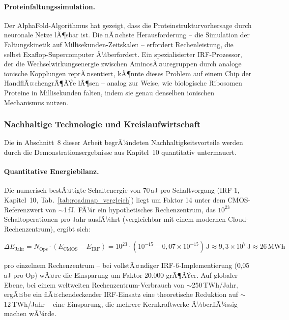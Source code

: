 ﻿\documentclass[a4paper,12pt]{scrreprt}
\theoremstyle{definition}
\begin{document}
\paragraph{Proteinfaltungssimulation.}
Der AlphaFold-Algorithmus hat gezeigt, dass die Proteinstrukturvorhersage
durch neuronale Netze lÃ¶sbar ist. Die nÃ¤chste Herausforderung -- die
Simulation der Faltungskinetik auf Millisekunden-Zeitskalen --
erfordert Rechenleistung, die selbst Exaflop-Supercomputer Ã¼berfordert.
Ein spezialisierter IRF-Prozessor, der die Wechselwirkungsenergie zwischen
AminosÃ¤uregruppen durch analoge ionische Kopplungen reprÃ¤sentiert,
kÃ¶nnte dieses Problem auf einem Chip der HandflÃ¤chengrÃ¶ÃŸe lÃ¶sen --
analog zur Weise, wie biologische Ribosomen Proteine in Millisekunden
falten, indem sie genau denselben ionischen Mechanismus nutzen.

\subsubsection{Nachhaltige Technologie und Kreislaufwirtschaft}
\label{subsubsec:nachhaltigkeit}

Die in Abschnitt~8 dieser Arbeit begrÃ¼ndeten Nachhaltigkeitsvorteile
werden durch die Demonstrationsergebnisse aus Kapitel~10 quantitativ
untermauert.

\paragraph{Quantitative Energiebilanz.}
Die numerisch bestÃ¤tigte Schaltenergie von 70\,aJ pro Schaltvorgang
(IRF-1, Kapitel~10, Tab.~\ref{tab:roadmap_vergleich}) liegt um Faktor 14
unter dem CMOS-Referenzwert von $\sim$1\,fJ. FÃ¼r ein hypothetisches
Rechenzentrum, das $10^{23}$ Schaltoperationen pro Jahr ausfÃ¼hrt
(vergleichbar mit einem modernen Cloud-Rechenzentrum), ergibt sich:

\begin{equation}
	\Delta E_\text{Jahr} = N_\text{Ops} \cdot (E_\text{CMOS} - E_\text{IRF})
	= 10^{23} \cdot (10^{-15} - 0{,}07 \times 10^{-15})\,\text{J}
	\approx 9{,}3 \times 10^{7}\,\text{J} \approx 26\,\text{MWh}
	\label{eq:energieeinsparung}
\end{equation}

pro einzelnem Rechenzentrum -- bei vollstÃ¤ndiger IRF-6-Implementierung
(0,05\,aJ pro Op) wÃ¤re die Einsparung um Faktor 20.000 grÃ¶ÃŸer.
Auf globaler Ebene, bei einem weltweiten Rechenzentrum-Verbrauch von
$\sim$250\,TWh/Jahr, ergÃ¤be ein flÃ¤chendeckender IRF-Einsatz eine
theoretische Reduktion auf $\sim$12\,TWh/Jahr -- eine Einsparung,
die mehrere Kernkraftwerke Ã¼berflÃ¼ssig machen wÃ¼rde.
\end{document}
